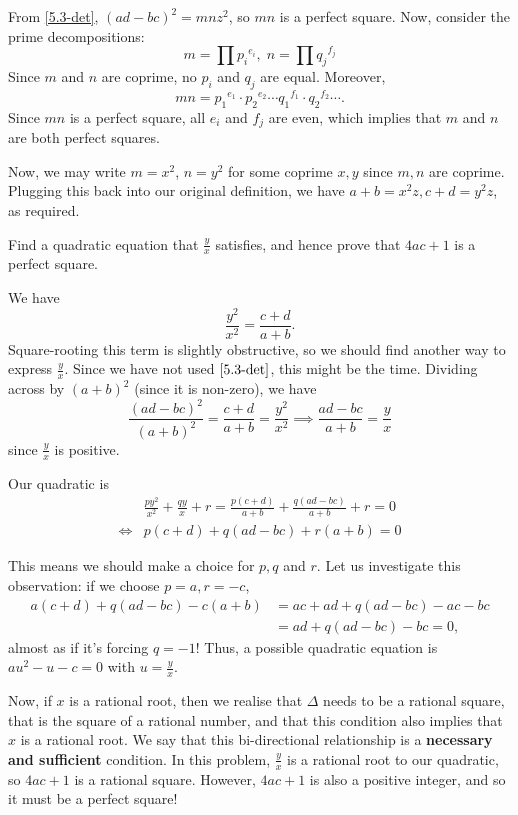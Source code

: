 \documentclass[../jarvis.tex]{subfiles}
\begin{document}
From \eqref{5.3-det}, $(ad-bc)^2=mnz^2$, so $mn$ is a perfect square. Now, consider the prime decompositions:
    $$m = \prod {p_i}^{e_i}, \;n = \prod {q_j}^{f_j}$$
Since $m$ and $n$ are coprime, no $p_i$ and $q_j$ are equal.
Moreover,
$$mn = {p_1}^{e_1}\cdot{p_2}^{e_2}\cdots{q_1}^{f_1}\cdot{q_2}^{f_2}\cdots.$$
Since $mn$ is a perfect square, all $e_i$ and $f_j$ are even, which implies that $m$ and $n$ are both perfect squares.

Now, we may write $m=x^2$, $n=y^2$ for some coprime $x,y$ since $m, n$ are coprime. Plugging this back into our original definition, we have $a+b=x^2z, c+d=y^2z$, as required.
\begin{example}[cont.]
Find a quadratic equation that $\frac{y}{x}$ satisfies, and hence prove that $4ac+1$ is a perfect square.
\end{example}
We have
$$\frac{y^2}{x^2}=\frac{c+d}{a+b}.$$
Square-rooting this term is slightly obstructive, so we should find another way to express $\frac{y}{x}$. Since we have not used $\eqref{5.3-det}$, this might be the time. Dividing across by $(a+b)^2$ (since it is non-zero), we have
$$\frac{(ad-bc)^2}{(a+b)^2}=\frac{c+d}{a+b}=\frac{y^2}{x^2} \implies \frac{ad-bc}{a+b}=\frac{y}{x}$$
since $\frac{y}{x}$ is positive.

Our quadratic is
\begin{align*}
   &\frac{py^2}{x^2}+\frac{qy}{x}+r=\frac{p(c+d)}{a+b}+\frac{q(ad-bc)}{a+b}+r=0 \\
   \Longleftrightarrow &p(c+d)+q(ad-bc)+r(a+b)=0
\end{align*}

This means we should make a choice for $p, q$ and $r$. Let us investigate this observation: if we choose $p=a, r=-c$,
\begin{align*}
    a(c+d)+q(ad-bc)-c(a+b)&=ac+ad+q(ad-bc)-ac-bc\\
    &=ad+q(ad-bc)-bc=0,
\end{align*}
almost as if it's forcing $q=-1$!
Thus, a possible quadratic equation is $au^2-u-c=0$ with $u=\frac{y}{x}$.

Now, if $x$ is a rational root, then we realise that $\Delta$ needs to be a rational square, that is the square of a rational number, and that this condition also implies that $x$ is a rational root. We say that this bi-directional relationship is a \textbf{necessary and sufficient} condition. In this problem, $\frac{y}{x}$ is a rational root to our quadratic, so $4ac+1$ is a rational square. However, $4ac+1$ is also a positive integer, and so it must be a perfect square!
\end{document}
